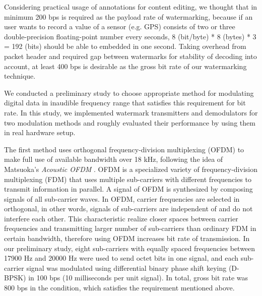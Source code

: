 
Considering practical usage of annotations for content editing, we thought that in minimum 200 bps is required as the payload rate of watermarking, because if an user wants to record a value of a sensor (e.g. GPS) consists of two or three double-precision floating-point number every seconds, 8 (bit/byte) * 8 (bytes) * 3 = 192 (bits) should be able to embedded in one second.
Taking overhead from packet header and required gap between watermarks for stability of decoding into account, at least 400 bps is desirable as the gross bit rate of our watermarking technique.

We conducted a preliminary study to choose appropriate method for modulating digital data in inaudible frequency range that satisfies this requirement for bit rate.
In this study, we implemented watermark transmitters and demodulators for two modulation methods and roughly evaluated their performance by using them in real hardware setup.

The first method uses orthogonal frequency-division multiplexing (OFDM) to make full use of available bandwidth over 18 kHz, following the idea of Matsuoka's {\it Acoustic OFDM} \cite{matsuoka2008acoustic}.
OFDM is a specialized variety of frequency-division 
multiplexing (FDM) that uses multiple sub-carriers with different frequencies to transmit information in parallel.
A signal of OFDM is synthesized by composing signals of all sub-carrier waves.
In OFDM, carrier frequencies are selected in orthogonal, in other words, signals of sub-carriers are independent of and do not interfere each other.
This characteristic realize closer spaces between carrier frequencies and transmitting larger number of sub-carriers than ordinary FDM in certain bandwidth, therefore using OFDM increases bit rate of transmission.
In our preliminary study, eight sub-carriers with equally spaced frequencies between 17900 Hz and 20000 Hz were used to send octet bits in one signal, and each sub-carrier signal was modulated using differential binary phase shift keying (D-BPSK) in 100 bps (10 milliseconds per unit signal).
In total, gross bit rate was 800 bps in the condition, which satisfies the requirement mentioned above.

